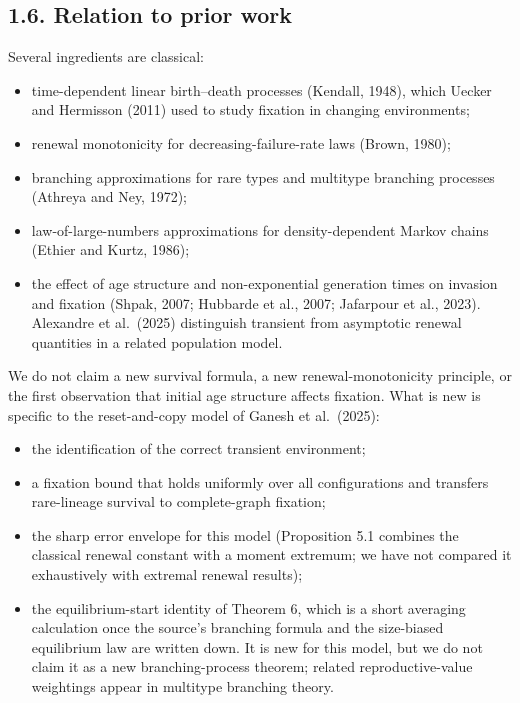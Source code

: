 \documentclass[
  british,
  11pt,
  a4paper,
]{article}
\providecommand{\tightlist}{%
  \setlength{\itemsep}{0pt}\setlength{\parskip}{0pt}}
\begin{document}
\subsection{1.6. Relation to prior work}\label{relation-to-prior-work}

Several ingredients are classical:

\begin{itemize}
\tightlist
\item
  time-dependent linear birth--death processes (Kendall, 1948), which
  Uecker and Hermisson (2011) used to study fixation in changing
  environments;
\item
  renewal monotonicity for decreasing-failure-rate laws (Brown, 1980);
\item
  branching approximations for rare types and multitype branching
  processes (Athreya and Ney, 1972);
\item
  law-of-large-numbers approximations for density-dependent Markov
  chains (Ethier and Kurtz, 1986);
\item
  the effect of age structure and non-exponential generation times on
  invasion and fixation (Shpak, 2007; Hubbarde et al., 2007; Jafarpour
  et al., 2023). Alexandre et al.~(2025) distinguish transient from
  asymptotic renewal quantities in a related population model.
\end{itemize}

We do not claim a new survival formula, a new renewal-monotonicity
principle, or the first observation that initial age structure affects
fixation. What is new is specific to the reset-and-copy model of Ganesh
et al.~(2025):

\begin{itemize}
\tightlist
\item
  the identification of the correct transient environment;
\item
  a fixation bound that holds uniformly over all configurations and
  transfers rare-lineage survival to complete-graph fixation;
\item
  the sharp error envelope for this model (Proposition 5.1 combines the
  classical renewal constant with a moment extremum; we have not
  compared it exhaustively with extremal renewal results);
\item
  the equilibrium-start identity of Theorem 6, which is a short
  averaging calculation once the source's branching formula and the
  size-biased equilibrium law are written down. It is new for this
  model, but we do not claim it as a new branching-process theorem;
  related reproductive-value weightings appear in multitype branching
  theory.
\end{itemize}
\end{document}
